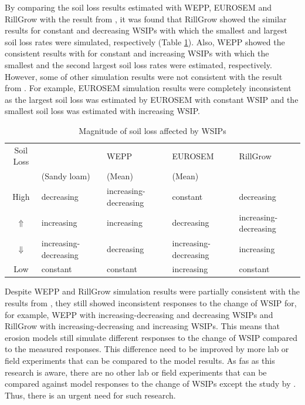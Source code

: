 By comparing the soil loss results estimated with WEPP, EUROSEM and RillGrow
with the result from \citet{parsons2006-68}, it was found that RillGrow showed
the similar results for constant and decreasing WSIPs with which the smallest
and largest soil loss rates were simulated, respectively (Table
\ref{tab:MagnitudeofSoilLossAffectedByIntraStormPatterns}). Also, WEPP showed
the consistent results with \citet{parsons2006-68} for constant and increasing
WSIPs with which the smallest and the second largest soil loss rates were
estimated, respectively. However, some of other simulation results were not
consistent with the result from \citet{parsons2006-68}. For example, EUROSEM
simulation results were completely inconsistent as the largest soil loss was
estimated by EUROSEM with constant WSIP and the smallest soil loss was
estimated with increasing WSIP.

\begin{table}[htbp]
  \centering
  \scriptsize
  \caption{Magnitude of soil loss affected by WSIPs}
  \label{tab:MagnitudeofSoilLossAffectedByIntraStormPatterns}
    \begin{tabular}{cllll}
      \toprule
      Soil Loss & \citet{parsons2006-68}  & WEPP & EUROSEM &
RillGrow \\
                & (Sandy loam) & (Mean) & (Mean) & \\
      \midrule
      High & decreasing & increasing-decreasing & constant &
decreasing\\
      $\Uparrow$ & increasing & increasing & decreasing &
increasing-decreasing\\
      $\Downarrow$ & increasing-decreasing & decreasing &
increasing-decreasing & increasing\\
      Low & constant & constant & increasing & constant\\
      \bottomrule
    \end{tabular}
\end{table}

Despite WEPP and RillGrow simulation results were partially consistent with the
results from \citet{parsons2006-68}, they still showed inconsistent responses to
the change of WSIP for, for example, WEPP with increasing-decreasing and
decreasing WSIPs and RillGrow with increasing-decreasing and increasing WSIPs.
This means that erosion models still simulate different responses to the change
of WSIP compared to the measured responses. This difference need to be improved
by more lab or field experiments that can be compared to the model results.
As fas as this research is aware, there are no other lab or field experiments
that can be compared against model responses to the change of WSIPs except the
study by \citet{parsons2006-68}. Thus, there is an urgent need for such
research.

